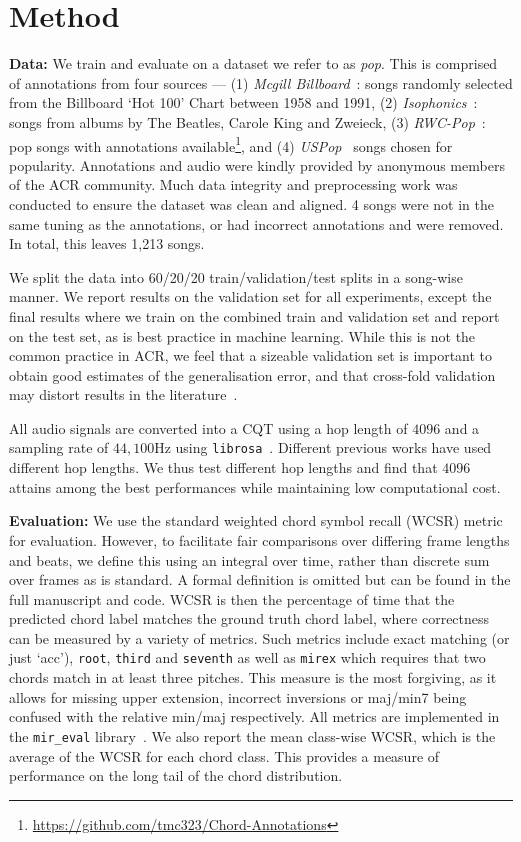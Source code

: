\section{Method}\label{sec:method}

\textbf{Data:} We train and evaluate on a dataset we refer to as \emph{pop}. This is comprised of annotations from four sources — (1) \emph{Mcgill Billboard}~\cite{McgillBillboard}: songs randomly selected from the Billboard `Hot 100' Chart between 1958 and 1991, (2) \emph{Isophonics}~\cite{Isophonics}: songs from albums by The Beatles, Carole King and Zweieck, (3) \emph{RWC-Pop}~\cite{RWC}: pop songs with annotations available\footnote{\url{https://github.com/tmc323/Chord-Annotations}}, and (4) \emph{USPop}~\cite{USPop} songs chosen for popularity. Annotations and audio were kindly provided by anonymous members of the ACR community. Much data integrity and preprocessing work was conducted to ensure the dataset was clean and aligned. 4 songs were not in the same tuning as the annotations, or had incorrect annotations and were removed. In total, this leaves 1,213 songs.

We split the data into 60/20/20 train/validation/test splits in a song-wise manner. We report results on the validation set for all experiments, except the final results where we train on the combined train and validation set and report on the test set, as is best practice in machine learning. While this is not the common practice in ACR, we feel that a sizeable validation set is important to obtain good estimates of the generalisation error, and that cross-fold validation may distort results in the literature~\cite{biascv}.

All audio signals are converted into a CQT using a hop length of $4096$ and a sampling rate of $44,100$Hz using \texttt{librosa}~\cite{librosa}. Different previous works have used different hop lengths. We thus test different hop lengths and find that $4096$ attains among the best performances while maintaining low computational cost.

\textbf{Evaluation:} We use the standard weighted chord symbol recall (WCSR) metric for evaluation. However, to facilitate fair comparisons over differing frame lengths and beats, we define this using an integral over time, rather than discrete sum over frames as is standard. A formal definition is omitted but can be found in the full manuscript and code. WCSR is then the percentage of time that the predicted chord label matches the ground truth chord label, where correctness can be measured by a variety of metrics. Such metrics include exact matching (or just `acc'), \texttt{root}, \texttt{third} and \texttt{seventh} as well as \texttt{mirex} which requires that two chords match in at least three pitches. This measure is the most forgiving, as it allows for missing upper extension, incorrect inversions or maj/min7 being confused with the relative min/maj respectively. All metrics are implemented in the \texttt{mir\_eval} library~\cite{mir_eval}. We also report the mean class-wise WCSR, which is the average of the WCSR for each chord class. This provides a measure of performance on the long tail of the chord distribution.

